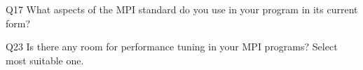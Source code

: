 \begin{description}%
\item{Q17} What aspects of the MPI standard do you use in your program in its current form?%
\item{Q23} Is there any room for performance tuning in your MPI programs? Select most suitable one.%
\end{description}%
